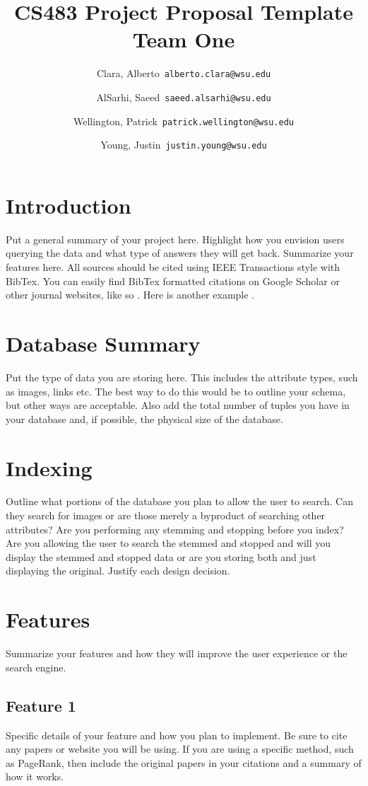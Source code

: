 \documentclass[11pt]{article}
\title{CS483 Project Proposal Template\\
\large Team One}
\author{
  Clara, Alberto\      \texttt{alberto.clara@wsu.edu}
  \and
  AlSarhi, Saeed\      \texttt{saeed.alsarhi@wsu.edu}
  \and
  Wellington, Patrick\      \texttt{patrick.wellington@wsu.edu}
  \and
  Young, Justin\      \texttt{justin.young@wsu.edu}
}
\date{}
\begin{document}
\maketitle

\section{Introduction}
Put a general summary of your project here. Highlight how you envision users querying the data and what type of answers they will get back. Summarize your features here. All sources should be cited using IEEE Transactions style with BibTex. You can easily find BibTex formatted citations on Google Scholar or other journal websites, like so \cite{amer2000optimizing}. Here is another example \cite{antoshenkov1995byte}.

\section{Database Summary}
Put the type of data you are storing here. This includes the attribute types, such as images, links etc. The best way to do this would be to outline your schema, but other ways are acceptable. Also add the total number of tuples you have in your database and, if possible, the physical size of the database.

\section{Indexing}
Outline what portions of the database you plan to allow the user to search. Can they search for images or are those merely a byproduct of searching other attributes? Are you performing any stemming and stopping before you index? Are you allowing the user to search the stemmed and stopped and will you display the stemmed and stopped data or are you storing both and just displaying the original. Justify each design decision.

\section{Features}
Summarize your features and how they will improve the user experience or the search engine.

\subsection{Feature 1}
Specific details of your feature and how you plan to implement. Be sure to cite any papers or website you will be using. If you are using a specific method, such as PageRank, then include the original papers in your citations and a summary of how it works.
\end{document}
